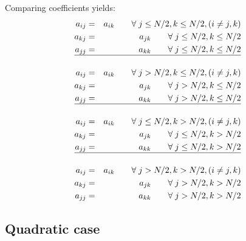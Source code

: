 Comparing coefficients yields:
\begin{eqnarray}
a_{ij} &=& a_{ik} \quad \quad \forall \;  j \le N/2, k \le N/2, (i \neq j, k) \nonumber \\
a_{kj} &=& a_{jk} \quad \quad \forall \;  j \le N/2, k \le N/2 \nonumber \\
a_{jj} &=& a_{kk} \quad \quad \forall \;  j \le N/2, k \le N/2 \nonumber\\
\hline \nonumber\\
a_{ij} &=& a_{ik} \quad \quad \forall \;  j > N/2, k \le N/2, (i \neq j, k) \nonumber \\
a_{kj} &=& a_{jk} \quad \quad \forall \;  j > N/2, k \le N/2 \nonumber \\
a_{jj} &=& a_{kk} \quad \quad \forall \;  j > N/2, k \le N/2 \nonumber\\
\hline \nonumber\\
a_{ij} &=& a_{ik} \quad \quad \forall \;  j \le N/2, k > N/2, (i \neq j, k) \nonumber \\
a_{kj} &=& a_{jk} \quad \quad \forall \;  j \le N/2, k > N/2 \nonumber \\
a_{jj} &=& a_{kk} \quad \quad \forall \;  j \le N/2, k > N/2 \nonumber\\
\hline \nonumber\\
a_{ij} &=& a_{ik} \quad \quad \forall \;  j > N/2, k > N/2, (i \neq j, k) \nonumber \\
a_{kj} &=& a_{jk} \quad \quad \forall \;  j > N/2, k > N/2 \nonumber \\
a_{jj} &=& a_{kk} \quad \quad \forall \;  j > N/2, k > N/2
\end{eqnarray}

\subsection{Quadratic case}

